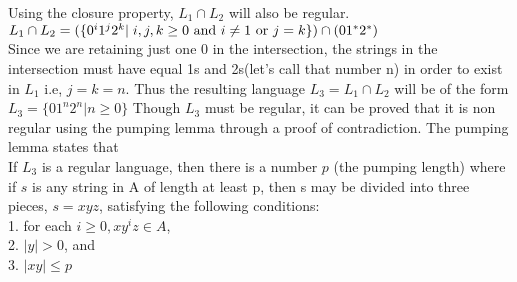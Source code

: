 \documentclass[a4page]{exam}
\begin{document}
\begin{questions}
\begin{parts}
\begin{solution}
      Using the closure property, $L_1 \cap L_2$ will also be regular. 
      \\$L_1 \cap L_2 = (\{0^i1^j2^k | \hspace{1mm} i,j,k \geq 0 \text{ and } i \neq 1 \text{ or } j = k\}) \cap ({01^*2^*})$
      \\Since we are retaining just one 0 in the intersection, the strings in the intersection must have equal 1s and 2s(let's call that number n) in order to exist in $L_1$ i.e, $j=k=n$. Thus the resulting language $L_3 = L_1 \cap L_2 $ will be of the form
      \\$ L_3 = \{ 01^n2^n | n \geq 0 \} $
      Though $L_3$ must be regular, it can be proved that it is non regular using the pumping lemma through a proof of contradiction. The pumping lemma states that
      \\If $L_3$ is a regular language, then there is a number $p$ (the
      pumping length) where if $s$ is any string in A of length at least p, then s may be divided into three pieces, $s = xyz$, satisfying the following conditions:
      \\1. for each $i \geq 0, xy^iz  \in A$,
      \\2. $|y| > 0$, and
      \\3. $|xy| \leq p$


\end{solution}
\end{parts}
\end{questions}
\end{document}

